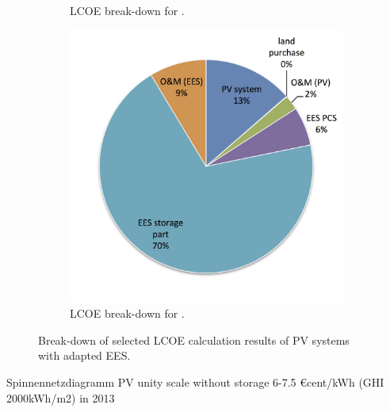 \begin{figure}[!htbp]
\begin{subfigure}[b]{0.5\textwidth}
                \caption{LCOE break-down for .}\label{PTC_LCOE_90_BreakDown}
        \end{subfigure}
\par\medskip %
        \begin{subfigure}[b]{0.5\textwidth}
                \centering
                \includegraphics[width=1\textwidth]{FIG/PV_LCOE_90_BreakDown}
                \caption{LCOE break-down for .}\label{PV_LCOE_90_BreakDown}
        \end{subfigure}
        \caption[Break-down of selected LCOE calculation results of PV systems with adapted EES.]{Break-down of selected LCOE calculation results of PV systems with adapted EES.}\label{SMPV_LCOE_BreakDown}
\end{figure}


Spinnennetzdiagramm 
PV unity scale without storage 
6-7.5 €cent/kWh (GHI 2000kWh/m2) in 2013 \cite{FraunhoferISE2013}\\\\

